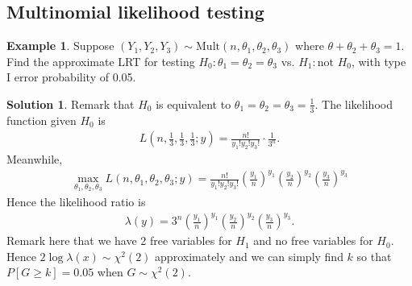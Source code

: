 \documentclass[11pt]{amsart}
\theoremstyle{definition}
\newtheorem{example}[theorem]{Example}
\newtheorem{solution}[theorem]{Solution}
\numberwithin{equation}{section}
\begin{document}
\subsection{Multinomial likelihood testing}
\begin{example}
    Suppose $(Y_1,Y_2,Y_3)\sim\mathrm{Mult}(n,\theta_1,\theta_2,\theta_3)$ where $\theta+\theta_2+\theta_3=1$. Find the approximate LRT for testing $H_0:\theta_1=\theta_2=\theta_3$ vs. $H_1:\text{not }H_0$, with type I error probability of 0.05.
\end{example}
\addtocounter{theorem}{-1}
\begin{solution}
    Remark that $H_0$ is equivalent to $\theta_1=\theta_2=\theta_3=\frac{1}{3}$. The likelihood function given $H_0$ is
    \begin{align*}
        L(n,\frac{1}{3},\frac{1}{3},\frac{1}{3};y)=\frac{n!}{y_1!y_2!y_3!}\cdot\frac{1}{3^n}.
    \end{align*}
    Meanwhile, 
    \begin{align*}
        \max_{\theta_1,\theta_2,\theta_3}L(n,\theta_1,\theta_2,\theta_3;y)=\frac{n!}{y_1!y_2!y_3!}\left(\frac{y_1}{n}\right)^{y_1}\left(\frac{y_2}{n}\right)^{y_2}\left(\frac{y_3}{n}\right)^{y_3}
    \end{align*}
    Hence the likelihood ratio is
    \begin{align*}
        \lambda(y)=3^n\left(\frac{y_1}{n}\right)^{y_1}\left(\frac{y_2}{n}\right)^{y_2}\left(\frac{y_3}{n}\right)^{y_3}.
    \end{align*}
    Remark here that we have 2 free variables for $H_1$ and no free variables for $H_0$. Hence $2\log\lambda(x)\sim\chi^2(2)$ approximately and we can simply find $k$ so that $P[G\ge k]=0.05$ when $G\sim\chi^2(2)$. 
\end{solution}
\end{document}
